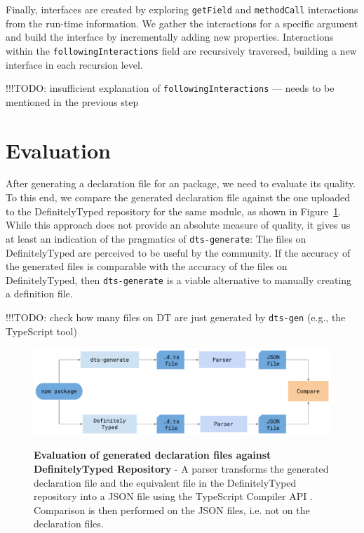 \documentclass[a4paper,english,cleveref, autoref]{lipics-v2019}
\newcommand{\figref}[1]{Figure~\ref{#1}}
\begin{document}
Finally, interfaces are created by exploring \texttt{getField} and
\texttt{methodCall} interactions from the run-time information. We
gather the interactions for a specific argument and build the
interface by incrementally adding new properties. Interactions within
the \texttt{followingInteractions} field are recursively traversed,
building a new interface in each recursion level.

!!!TODO: insufficient explanation of \texttt{followingInteractions}
--- needs to be mentioned in the previous step

\section{Evaluation}
\label{sec:dts-generate-evaluation}
After generating a declaration file for an \NPM{} package, we need to
evaluate its quality. To this end, we compare the generated
declaration file against the one uploaded to the DefinitelyTyped
repository for the same module, as shown in
\figref{fig:evaluation-diagram}. While this approach does not provide
an absolute measure of quality, it gives us at least an indication of
the pragmatics of \texttt{dts-generate}: The files on DefinitelyTyped
are perceived to be useful by the community. If the accuracy of the
generated files is comparable with the accuracy of the files on
DefinitelyTyped, then \texttt{dts-generate} is a viable alternative to
manually creating a definition file.

!!!TODO: check how many files on DT are just generated by
\texttt{dts-gen} (e.g., the TypeScript tool)
 
\begin{figure}[tp]
    \begin{centering}
        {\includegraphics[width=1\textwidth]{evaluation-diagram.pdf}}
        \caption[Evaluation against DefinitelyTyped Repository]{\textbf{Evaluation of generated declaration files against DefinitelyTyped Repository} - A parser transforms the generated declaration file and the equivalent file in the DefinitelyTyped repository into a JSON file using the TypeScript Compiler API \cite{typescript-compiler-api}. Comparison is then performed on the JSON files, i.e. not on the declaration files.}
        \label{fig:evaluation-diagram}
    \end{centering}
\end{figure}
\end{document}
